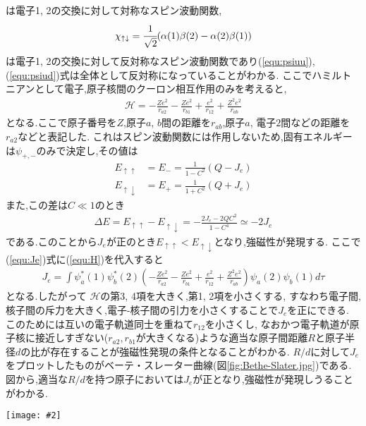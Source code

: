 \documentclass[uplatex,a4j,11pt,dvipdfmx]{jsarticle}
\makeatletter
\def\fgcaption{\def\@captype{figure}\caption}
\newcommand{\mfig}[3][width=15cm]{
\begin{center}
\texttt{[image: \#2]}
\fgcaption{#3 \label{fig:#2}}
\end{center}
}
\makeatother
\begin{document}
は電子1, 2の交換に対して対称なスピン波動関数,
\begin{align}
  \chi_{\uparrow\downarrow}=\cfrac{1}{\sqrt{2}}(\alpha(1)\beta(2)-\alpha(2)\beta(1))
\end{align}
は電子1, 2の交換に対して反対称なスピン波動関数であり(\ref{equ:psiuu}), (\ref{equ:psiud})式は全体として反対称になっていることがわかる.
ここでハミルトニアンとして電子,原子核間のクーロン相互作用のみを考えると,
\begin{align}
  \label{equ:H}
  \mathcal{H}=-\frac{Ze^2}{r_{a2}}-\frac{Ze^2}{r_{b1}}+\frac{e^2}{r_{12}}+\frac{Z^2e^2}{r_{ab}}
\end{align}
となる.ここで原子番号を$Z$,原子$a$, $b$間の距離を$r_{ab}$,原子$a$, 電子$2$間などの距離を$r_{a2}$などと表記した.
これはスピン波動関数には作用しないため,固有エネルギーは$\psi_{+,-}$のみで決定し,その値は
\begin{align}
  E_{\uparrow\uparrow}&=E_-=\frac{1}{1-C^2}(Q-J_e)\\
  E_{\uparrow\downarrow}&=E_+=\frac{1}{1+C^2}(Q+J_e)
\end{align}
また,この差は$C\ll1$のとき
\begin{align}
  \Delta E=E_{\uparrow\uparrow}-E_{\uparrow\downarrow}=-\frac{2J_e-2QC^2}{1-C^4}\simeq-2J_e
\end{align}
である.このことから$J_e$が正のとき$E_{\uparrow\uparrow}<E_{\uparrow\downarrow}$となり,強磁性が発現する.
ここで(\ref{equ:Je})式に(\ref{equ:H})を代入すると
\begin{align}
  J_e=\int\psi_a^*(1)\psi_b^*(2)\left(-\frac{Ze^2}{r_{a2}}-\frac{Ze^2}{r_{b1}}+\frac{e^2}{r_{12}}+\frac{Z^2e^2}{r_{ab}}\right)\psi_a(2)\psi_b(1)d\tau
\end{align}
となる.したがって $\mathcal{H}$の第3, 4項を大きく,第1, 2項を小さくする,
すなわち電子間,核子間の斥力を大きく,電子-核子間の引力を小さくすることで$J_e$を正にできる.
このためには互いの電子軌道同士を重ねて$r_{12}$を小さくし,
なおかつ電子軌道が原子核に接近しすぎない($r_{a2}, r_{b1}$が大きくなる)ような適当な原子間距離$R$と原子半径$d$の比が存在することが強磁性発現の条件となることがわかる.
$R/d$に対して$J_e$をプロットしたものがベーテ・スレーター曲線(図\ref{fig:Bethe-Slater.jpg})である.図から,適当な$R/d$を持つ原子においては$J_e$が正となり,強磁性が発現しうることがわかる.
\mfig[width=8cm]{Bethe-Slater.jpg}{ベーテ・スレーター曲線\cite{ouyoubussei}}
\end{document}
